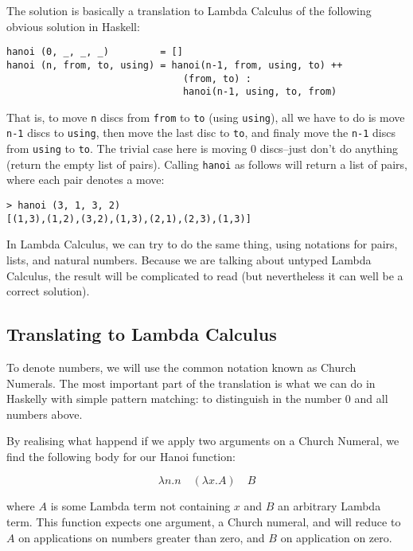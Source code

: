\documentclass[11pt]{article}
\begin{document}
The solution is basically a translation to Lambda Calculus of the following obvious solution in Haskell:

\begin{verbatim}
hanoi (0, _, _, _)         = []
hanoi (n, from, to, using) = hanoi(n-1, from, using, to) ++
                               (from, to) :
                               hanoi(n-1, using, to, from)
\end{verbatim}

That is, to move \verb|n| discs from \verb|from| to \verb|to| (using \verb|using|), all we have to do is move \verb|n-1| discs to \verb|using|, then move the last disc to \verb|to|, and finaly move the \verb|n-1| discs from \verb|using| to \verb|to|. The trivial case here is moving 0 discs--just don't do anything (return the empty list of pairs). Calling \verb|hanoi| as follows will return a list of pairs, where each pair denotes a move:

\begin{verbatim}
> hanoi (3, 1, 3, 2)
[(1,3),(1,2),(3,2),(1,3),(2,1),(2,3),(1,3)]
\end{verbatim}

In Lambda Calculus, we can try to do the same thing, using notations for pairs, lists, and natural numbers. Because we are talking about untyped Lambda Calculus, the result will be complicated to read (but nevertheless it can well be a correct solution).


\subsection{Translating to Lambda Calculus}

To denote numbers, we will use the common notation known as Church Numerals. The most important part of the translation is what we can do in Haskelly with simple pattern matching: to distinguish in the number 0 and all numbers above.

By realising what happend if we apply two arguments on a Church Numeral, we find the following body for our Hanoi function:

\begin{displaymath}
\lambda n.n \quad (\lambda x.A) \quad B
\end{displaymath}

where $A$ is some Lambda term not containing $x$ and $B$ an arbitrary Lambda term. This function expects one argument, a Church numeral, and will reduce to $A$ on applications on numbers greater than zero, and $B$ on application on zero.
\end{document}
